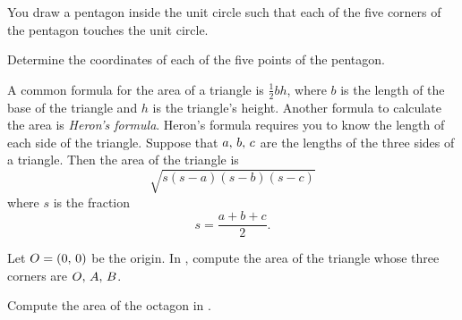 \documentclass[a4paper,oneside,12pt]{article}
\begin{document}
\begin{problem}
\item You draw a pentagon inside the unit circle such that each of the
  five corners of the pentagon touches the unit circle.
  \begin{packedenum}
  \item Determine the coordinates of each of the five points of the
    pentagon.
  \end{packedenum}

\item A common formula for the area of a triangle is $\frac{1}{2} bh$,
  where $b$ is the length of the base of the triangle and $h$ is the
  triangle's height.  Another formula to calculate the area is
  \emph{Heron's formula}.  Heron's formula requires you to know the
  length of each side of the triangle.  Suppose that
  ${a},\, {b},\, {c}$ are the lengths of the three sides of a triangle.
  Then the area of the triangle is
  \[
  \sqrt{
    s (s - a) (s - b) (s - c)
  }
  \]
  where $s$ is the fraction
  \[
  s
  =
  \frac{a + b + c}{2}.
  \]
  \begin{packedenum}
  \item\label{subprob:area_triangle_in_octagon}
    Let $O = \left\lparen{0},\, {0}\right\rparen$ be the origin.  In
    , compute the area of the
    triangle whose three corners are ${O},\, {A},\, {B}$.

  \item\label{subprob:area_of_octagon}
    Compute the area of the octagon in
    .
  \end{packedenum}
\end{problem}
\end{document}
